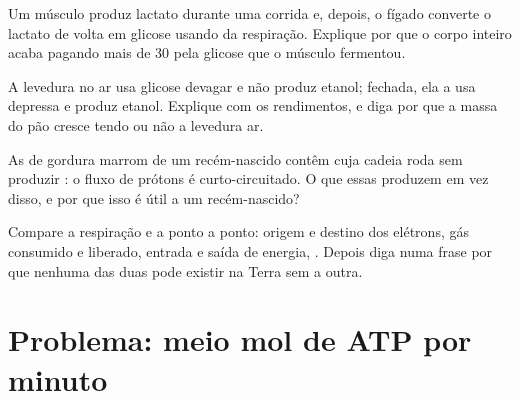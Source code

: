 \begin{exercise}[$\star\star\star$]\label{exo:g12:respiration-fermentation:12}
Um músculo produz lactato durante uma corrida e, depois, o fígado
converte o lactato de volta em glicose usando  da respiração.
Explique por que o corpo inteiro acaba pagando mais de 30  pela
glicose que o músculo fermentou.
\end{exercise}

\begin{exercise}[$\star\star\star$]\label{exo:g12:respiration-fermentation:13}
A levedura no ar usa glicose devagar e não produz etanol; fechada, ela
a usa depressa e produz etanol. Explique com os rendimentos, e diga por
que a massa do pão cresce tendo ou não a levedura ar.
\end{exercise}

\begin{exercise}[$\star\star\star$]\label{exo:g12:respiration-fermentation:14}
As  de gordura marrom de um recém-nascido contêm 
cuja cadeia roda sem produzir : o fluxo de prótons é curto-circuitado.
O que essas  produzem em vez disso, e por que isso é útil a um recém-nascido?
\end{exercise}

\begin{exercise}[$\star\star\star$]\label{exo:g12:respiration-fermentation:15}
Compare a respiração e a  ponto a ponto: origem e destino
dos elétrons, gás consumido e liberado, entrada e saída de energia,
. Depois diga numa frase por que nenhuma das duas pode existir
na Terra sem a outra.
\end{exercise}

\section{Problema: meio mol de ATP por minuto}

